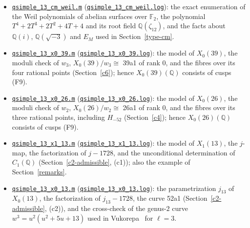 \documentclass[11pt]{article}
\newcommand{\Q}{\mathbb Q}
\newcommand{\F}{\mathbb F}
\begin{document}
\begin{itemize}
\item \href{https://genus-2-torsion.github.io/data/knowledge/sources/qsimple_13_cm_weil.m}{\texttt{qsimple\_\allowbreak{}13\_\allowbreak{}cm\_\allowbreak{}weil.m}} (\href{https://genus-2-torsion.github.io/data/knowledge/sources/qsimple_13_cm_weil.log}{\texttt{qsimple\_\allowbreak{}13\_\allowbreak{}cm\_\allowbreak{}weil.log}}): the exact enumeration of the
          Weil polynomials of abelian surfaces over \(\F_2\), the polynomial \(T^4+2T^3+2T^2+4T+4\) and its root
          field \(\Q(\zeta_{12})\), and the facts about \(\Q(i)\), \(\Q(\sqrt{-3})\) and \(E_M\) used in
          Section~\ref{type-cm}.
\item \href{https://genus-2-torsion.github.io/data/knowledge/sources/qsimple_13_x0_39.m}{\texttt{qsimple\_\allowbreak{}13\_\allowbreak{}x0\_\allowbreak{}39.m}} (\href{https://genus-2-torsion.github.io/data/knowledge/sources/qsimple_13_x0_39.log}{\texttt{qsimple\_\allowbreak{}13\_\allowbreak{}x0\_\allowbreak{}39.log}}): the model of \(X_0(39)\), the moduli check of
          \(w_3\), \(X_0(39)/w_3\cong\) 39a1 of rank \(0\), and the fibres over its four rational points
          (Section~\ref{c6}); hence \(X_0(39)(\Q)\) consists of cusps (F9).
\item \href{https://genus-2-torsion.github.io/data/knowledge/sources/qsimple_13_x0_26.m}{\texttt{qsimple\_\allowbreak{}13\_\allowbreak{}x0\_\allowbreak{}26.m}} (\href{https://genus-2-torsion.github.io/data/knowledge/sources/qsimple_13_x0_26.log}{\texttt{qsimple\_\allowbreak{}13\_\allowbreak{}x0\_\allowbreak{}26.log}}): the model of \(X_0(26)\), the moduli check of
          \(w_2\), \(X_0(26)/w_2\cong\) 26a1 of rank \(0\), and the fibres over its three rational points,
          including \(H_{-52}\) (Section~\ref{c4}); hence \(X_0(26)(\Q)\) consists of cusps (F9).
\item \href{https://genus-2-torsion.github.io/data/knowledge/sources/qsimple_13_x1_13.m}{\texttt{qsimple\_\allowbreak{}13\_\allowbreak{}x1\_\allowbreak{}13.m}} (\href{https://genus-2-torsion.github.io/data/knowledge/sources/qsimple_13_x1_13.log}{\texttt{qsimple\_\allowbreak{}13\_\allowbreak{}x1\_\allowbreak{}13.log}}): the model of \(X_1(13)\), the \(j\)-map, the
          factorization of \(j-1728\), and the unconditional determination of \(C_1(\Q)\)
          (Section~\ref{c2-admissible}, (c1)); also the example of Section~\ref{remarks}.
\item \href{https://genus-2-torsion.github.io/data/knowledge/sources/qsimple_13_x0_13.m}{\texttt{qsimple\_\allowbreak{}13\_\allowbreak{}x0\_\allowbreak{}13.m}} (\href{https://genus-2-torsion.github.io/data/knowledge/sources/qsimple_13_x0_13.log}{\texttt{qsimple\_\allowbreak{}13\_\allowbreak{}x0\_\allowbreak{}13.log}}): the parametrization \(j_{13}\) of \(X_0(13)\), the
          factorization of \(j_{13}-1728\), the curve 52a1 (Section~\ref{c2-admissible}, (c2)), and the cross-check of
          the genus-\(2\) curve \(w^3=u^2(u^2+5u+13)\) used in Vukorepa~\cite{Vuk} for \(\ell=3\).
\end{itemize}
\end{document}
